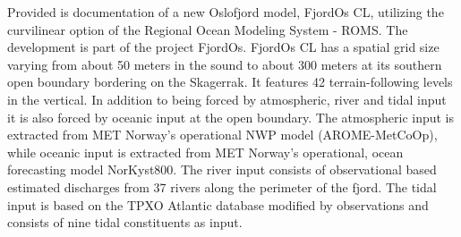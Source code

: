 Provided is documentation of a new Oslofjord model, FjordOs CL, utilizing the curvilinear option of the Regional Ocean Modeling System - ROMS. The development is part of the project FjordOs. FjordOs CL has a spatial grid size varying from about 50 meters in the {\DR} sound to about 300 meters at its southern open boundary bordering on the Skagerrak. It features 42 terrain-following levels in the vertical. In addition to being forced by atmospheric, river and tidal input it is also forced by oceanic input at the open boundary. The atmospheric input is extracted from MET Norway's operational NWP model (AROME-MetCoOp), while oceanic input is extracted from MET Norway's operational, ocean forecasting model NorKyst800. The river input consists of observational based estimated discharges from 37 rivers along the perimeter of the fjord. The tidal input is based on the TPXO Atlantic database modified by observations and consists of nine tidal constituents as input.
